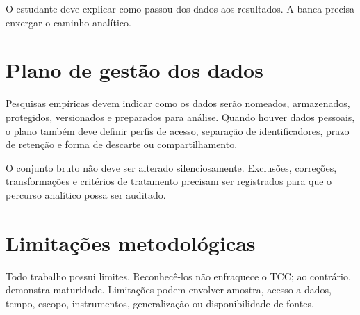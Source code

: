 O estudante deve explicar como passou dos dados aos resultados. A banca precisa enxergar o caminho analítico.

\section{Plano de gestão dos dados}

Pesquisas empíricas devem indicar como os dados serão nomeados, armazenados, protegidos, versionados e preparados para análise. Quando houver dados pessoais, o plano também deve definir perfis de acesso, separação de identificadores, prazo de retenção e forma de descarte ou compartilhamento.

O conjunto bruto não deve ser alterado silenciosamente. Exclusões, correções, transformações e critérios de tratamento precisam ser registrados para que o percurso analítico possa ser auditado.

\section{Limitações metodológicas}

Todo trabalho possui limites. Reconhecê-los não enfraquece o TCC; ao contrário, demonstra maturidade. Limitações podem envolver amostra, acesso a dados, tempo, escopo, instrumentos, generalização ou disponibilidade de fontes.

